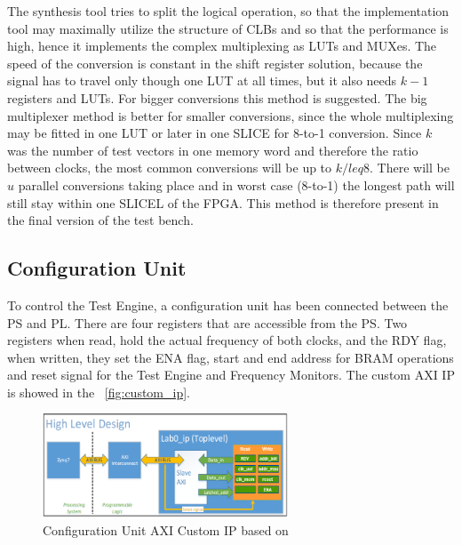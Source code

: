 The synthesis tool tries to split the logical operation, so that the implementation tool may maximally utilize the structure of CLBs and so that the performance is high, hence it implements the complex multiplexing as LUTs and MUXes. The speed of the conversion is constant in the shift register solution, because the signal has to travel only though one LUT at all times, but it also needs $k-1$ registers and LUTs. For bigger conversions this method is suggested. The big multiplexer method is better for smaller conversions, since the whole multiplexing may be fitted in one LUT or later in one SLICE for 8-to-1 conversion. Since $k$ was the number of test vectors in one memory word and therefore the ratio between clocks, the most common conversions will be up to $k/leq8$. There will be $u$ parallel conversions taking place and in worst case (8-to-1) the longest path will still stay within one SLICEL of the FPGA. This method is therefore present in the final version of the test bench.

\subsection{Configuration Unit}
To control the Test Engine, a configuration unit has been connected between the PS and PL. There are four registers that are accessible from the PS. Two registers when read, hold the actual frequency of both clocks, and the RDY flag, when written, they set the ENA flag, start and end address for BRAM operations and reset signal for the Test Engine and Frequency Monitors. The custom AXI IP is showed in the ~\autoref{fig:custom_ip}.

\begin{figure}[h]
\centering
\includegraphics[width=0.65\textwidth]{figures/Custom_ip.png}
\caption{Configuration Unit AXI Custom IP based on~\cite{report:custom_ip}}
\label{fig:custom_ip}
\end{figure}

